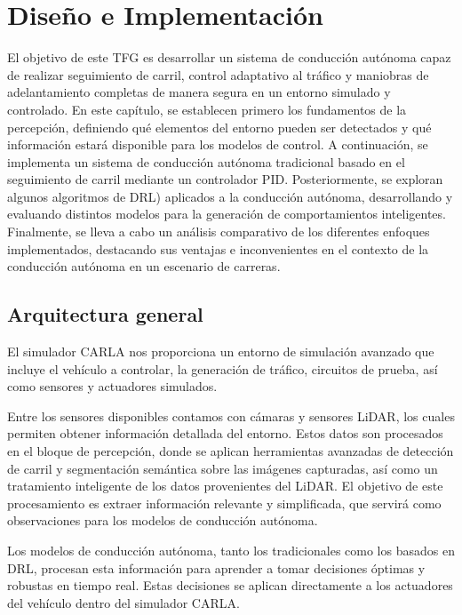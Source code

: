\chapter{Diseño e Implementación}
\label{cap:capitulo4}

El objetivo de este \ac{TFG} es desarrollar un sistema de conducción autónoma capaz de realizar seguimiento de carril, control adaptativo al tráfico y maniobras de adelantamiento completas de manera segura en un entorno simulado y controlado. En este capítulo, se establecen primero los fundamentos de la percepción, definiendo qué elementos del entorno pueden ser detectados y qué información estará disponible para los modelos de control. A continuación, se implementa un sistema de conducción autónoma tradicional basado en el seguimiento de carril mediante un controlador \ac{PID}. Posteriormente, se exploran algunos algoritmos de \ac{DRL}) aplicados a la conducción autónoma, desarrollando y evaluando distintos modelos para la generación de comportamientos inteligentes. Finalmente, se lleva a cabo un análisis comparativo de los diferentes enfoques implementados, destacando sus ventajas e inconvenientes en el contexto de la conducción autónoma en un escenario de carreras.

\section{Arquitectura general}

El simulador CARLA nos proporciona un entorno de simulación avanzado que incluye el vehículo a controlar, la generación de tráfico, circuitos de prueba, así como sensores y actuadores simulados.

Entre los sensores disponibles contamos con cámaras y sensores \ac{LiDAR}, los cuales permiten obtener información detallada del entorno. Estos datos son procesados en el bloque de percepción, donde se aplican herramientas avanzadas de detección de carril y segmentación semántica sobre las imágenes capturadas, así como un tratamiento inteligente de los datos provenientes del \ac{LiDAR}. El objetivo de este procesamiento es extraer información relevante y simplificada, que servirá como observaciones para los modelos de conducción autónoma.

Los modelos de conducción autónoma, tanto los tradicionales como los basados en \ac{DRL}, procesan esta información para aprender a tomar decisiones óptimas y robustas en tiempo real. Estas decisiones se aplican directamente a los actuadores del vehículo dentro del simulador CARLA.


